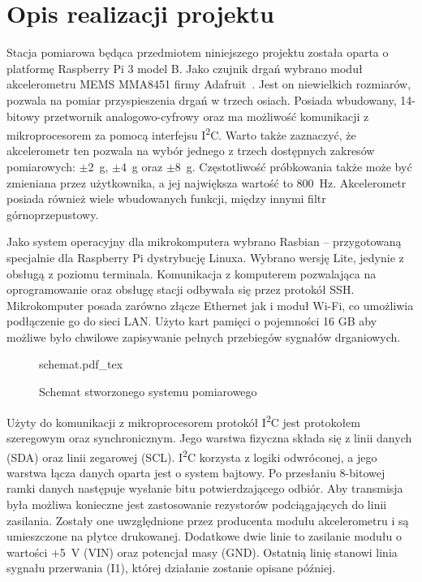\documentclass[a4paper,12pt]{mwart}
\begin{document}
\section{Opis realizacji projektu}

Stacja pomiarowa będąca przedmiotem niniejszego projektu została oparta o
platformę Raspberry Pi 3 model B. Jako czujnik drgań wybrano moduł akcelerometru
MEMS MMA8451 firmy Adafruit~\cite{mma8451}. Jest on niewielkich rozmiarów, pozwala na pomiar
przyspieszenia drgań w trzech osiach. Posiada wbudowany, 14-bitowy przetwornik
analogowo-cyfrowy oraz ma możliwość komunikacji z mikroprocesorem za pomocą
interfejsu I\textsuperscript{2}C. Warto także zaznaczyć, że akcelerometr ten
pozwala na wybór jednego z trzech dostępnych zakresów pomiarowych:
$\pm$\SI{2}{\g}, $\pm$\SI{4}{\g} oraz $\pm$\SI{8}{\g}. Częstotliwość próbkowania
także może być zmieniana przez użytkownika, a jej największa wartość to
\SI{800}{\hertz}. Akcelerometr posiada również wiele wbudowanych funkcji, między
innymi filtr górnoprzepustowy.

Jako system operacyjny dla mikrokomputera wybrano Rasbian -- przygotowaną
specjalnie dla Raspberry Pi dystrybucję Linuxa. Wybrano wersję Lite, jedynie z
obsługą z poziomu terminala. Komunikacja z komputerem pozwalająca na
oprogramowanie oraz obsługę stacji odbywała się przez protokół SSH.
Mikrokomputer posada zarówno złącze Ethernet jak i moduł Wi-Fi, co umożliwia
podłączenie go do sieci LAN. Użyto kart pamięci o pojemności 16 GB aby możliwe
było chwilowe zapisywanie pełnych przebiegów sygnałów drganiowych.

\begin{figure}[H]
  \centering
  {schemat.pdf_tex}
  \caption{Schemat stworzonego systemu pomiarowego}
  \label{fig:schemat}
\end{figure}

Użyty do komunikacji z mikroprocesorem protokół I\textsuperscript{2}C jest
protokołem szeregowym oraz synchronicznym. Jego warstwa fizyczna składa się z
linii danych (SDA) oraz linii zegarowej (SCL). I\textsuperscript{2}C korzysta z
logiki odwróconej, a jego warstwa łącza danych oparta jest o system bajtowy. Po
przesłaniu 8-bitowej ramki danych następuje wysłanie bitu potwierdzającego
odbiór. Aby transmisja była możliwa konieczne jest zastosowanie rezystorów
podciągających do linii zasilania. Zostały one uwzględnione przez producenta
modułu akcelerometru i są umieszczone na płytce drukowanej. Dodatkowe dwie linie
to zasilanie modułu o wartości $+$\SI{5}{\volt} (VIN) oraz potencjał masy (GND).
Ostatnią linię stanowi linia sygnału przerwania (I1), której działanie zostanie
opisane później.
\end{document}
